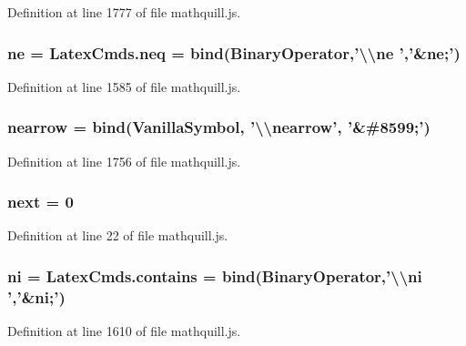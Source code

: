 Definition at line 1777 of file mathquill.\-js.

\subsubsection[{ne}]{ ne = Latex\-Cmds.\-neq = {\bf bind}({\bf Binary\-Operator},'\textbackslash{}\textbackslash{}ne ','\&ne;')}\label{mathquill_8js_ae3ebc55b64f04e81d70ee67854bdebb0}


Definition at line 1585 of file mathquill.\-js.

\subsubsection[{nearrow}]{ nearrow = {\bf bind}({\bf Vanilla\-Symbol}, '\textbackslash{}\textbackslash{}nearrow', '\&\#8599;')}\label{mathquill_8js_acd99aa0bfabf0f4e7335a41bb29571ce}


Definition at line 1756 of file mathquill.\-js.

\subsubsection[{next}]{\setlength{\rightskip}{0pt plus 5cm}{\bf \-\_\-} next = 0}\label{mathquill_8js_a71d717cccd5ca77c83d1802529fee374}


Definition at line 22 of file mathquill.\-js.

\subsubsection[{ni}]{ ni = Latex\-Cmds.\-contains = {\bf bind}({\bf Binary\-Operator},'\textbackslash{}\textbackslash{}ni ','\&ni;')}\label{mathquill_8js_a963f3bff5a5c9de550b2bf7a691e029a}


Definition at line 1610 of file mathquill.\-js.

